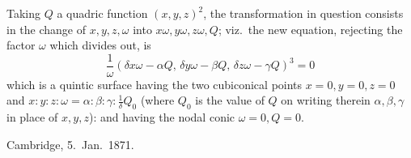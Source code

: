 \documentclass{article}
\begin{document}
Taking $Q$ a quadric function $(x, y, z)^2$, the transformation in question consists in the change of $x, y, z, \omega$ into $x\omega, y\omega, z\omega, Q$; viz.\ the new equation, rejecting the factor $\omega$ which divides out, is
\[
\frac{1}{\omega} (\delta x\omega - \alpha Q, \, \delta y\omega - \beta Q, \, \delta z\omega - \gamma Q)^3 = 0
\]
which is a quintic surface having the two cubiconical points $x = 0, y = 0, z = 0$ and $x : y : z : \omega = \alpha : \beta : \gamma : \frac{1}{\delta} Q_0$ (where $Q_0$ is the value of $Q$ on writing therein $\alpha, \beta, \gamma$ in place of $x, y, z$): and having the nodal conic $\omega = 0, Q = 0$.

Cambridge, 5.\ Jan.\ 1871.
\end{document}
